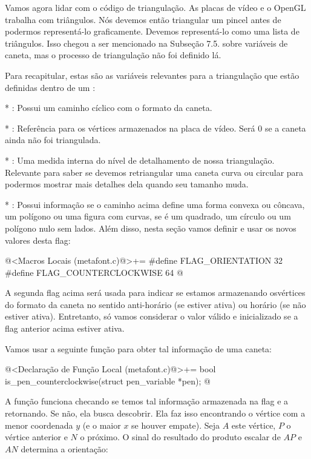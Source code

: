 {

Vamos agora lidar com o código de triangulação. As placas de vídeo e o
OpenGL trabalha com triângulos. Nós devemos então triangular um pincel
antes de podermos representá-lo graficamente. Devemos representá-lo
como uma lista de triângulos. Isso chegou a ser mencionado na Subseção
7.5. sobre variáveis de caneta, mas o processo de triangulação não foi
definido lá.

Para recapitular, estas são as variáveis relevantes para a
triangulação que estão definidas dentro de um :

* : Possui um caminho
  cíclico com o formato da caneta.

* : Referência para os vértices armazenados
  na placa de vídeo. Será 0 se a caneta ainda não foi triangulada.

* : Uma medida interna do nível
  de detalhamento de nossa triangulação. Relevante para saber se devemos
  retriangular uma caneta curva ou circular para podermos mostrar mais
  detalhes dela quando seu tamanho muda.

* : Possui informação se o caminho acima define
  uma forma convexa ou côncava, um polígono ou uma figura com curvas,
  se é um quadrado, um círculo ou um polígono nulo sem lados. Além
  disso, nesta seção vamos definir e usar os novos valores desta flag:

\iniciocodigo
@<Macros Locais (metafont.c)@>+=
#define FLAG_ORIENTATION      32
#define FLAG_COUNTERCLOCKWISE 64
@
\fimcodigo

A segunda flag acima será usada para indicar se estamos armazenando
osvértices do formato da caneta no sentido anti-horário (se estiver
ativa) ou horário (se não estiver ativa). Entretanto, só vamos
considerar o valor válido e inicializado se a flag anterior acima
estiver ativa.

Vamos usar a seguinte função para obter tal informação de uma caneta:

\iniciocodigo
@<Declaração de Função Local (metafont.c)@>+=
bool is_pen_counterclockwise(struct pen_variable *pen);
@
\fimcodigo

A função funciona checando se temos tal informação armazenada na flag
e a retornando. Se não, ela busca descobrir. Ela faz isso encontrando
o vértice com a menor coordenada $y$ (e o maior $x$ se houver
empate). Seja $A$ este vértice, $P$ o vértice anterior e $N$ o
próximo. O sinal do resultado do produto escalar de $AP$ e $AN$
determina a orientação:

}
